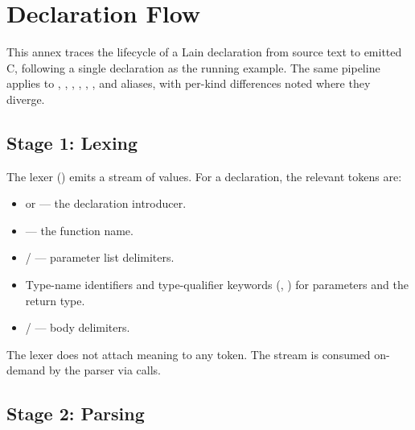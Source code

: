 \chapter{Declaration Flow}
\label{annex:D-declaration-flow}

\pnum
This annex traces the lifecycle of a Lain declaration from source text to
emitted C, following a single  declaration as the running example.
The same pipeline applies to , , ,
, , , and  aliases,
with per-kind differences noted where they diverge.

\section{Stage 1: Lexing}
\label{sec:df-lex}

\pnum
The lexer () emits a stream of  values.
For a declaration, the relevant tokens are:
\begin{itemize}
\item {} or  — the
  declaration introducer.
\item {} — the function name.
\item {} /  — parameter list delimiters.
\item Type-name identifiers and type-qualifier keywords
  (, ) for parameters
  and the return type.
\item {} /  — body delimiters.
\end{itemize}

\pnum
The lexer does not attach meaning to any token.  The stream is consumed
on-demand by the parser via  calls.

\section{Stage 2: Parsing}
\label{sec:df-parse}

